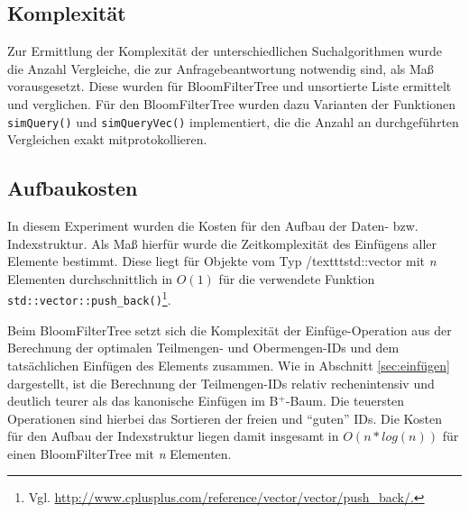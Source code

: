 \subsection{Komplexität}\label{sec:komplexität}
Zur Ermittlung der Komplexität der unterschiedlichen Suchalgorithmen wurde die Anzahl Vergleiche, die zur Anfragebeantwortung notwendig sind, als Maß vorausgesetzt. Diese wurden für BloomFilterTree und unsortierte Liste ermittelt und verglichen. Für den BloomFilterTree wurden dazu Varianten der Funktionen \texttt{simQuery()} und \texttt{simQueryVec()} implementiert, die die Anzahl an durchgeführten Vergleichen exakt mitprotokollieren.   
\subsection{Aufbaukosten}\label{sec:aufbaukosten}
In diesem Experiment wurden die Kosten für den Aufbau der Daten- bzw. Indexstruktur. Als Maß hierfür wurde die Zeitkomplexität des Einfügens aller Elemente bestimmt. Diese liegt für Objekte vom Typ /texttt{std::vector} mit \textit{n} Elementen durchschnittlich in $O(1)$ für die verwendete Funktion \texttt{std::vector::push\_back()}\footnote{Vgl. \url{http://www.cplusplus.com/reference/vector/vector/push_back/.}}. 

\noindent
Beim BloomFilterTree setzt sich die Komplexität der Einfüge-Operation aus der Berechnung der optimalen Teilmengen- und Obermengen-IDs und dem tatsächlichen Einfügen des Elements zusammen. Wie in Abschnitt \ref{sec:einfügen} dargestellt, ist die Berechnung der Teilmengen-IDs relativ rechenintensiv und deutlich teurer als das kanonische Einfügen im B$^+$-Baum. Die teuersten Operationen sind hierbei das Sortieren der freien und "`guten"' IDs. Die Kosten für den Aufbau der Indexstruktur liegen damit insgesamt in $O(n\ast log(n))$ für einen BloomFilterTree mit \textit{n} Elementen. 

